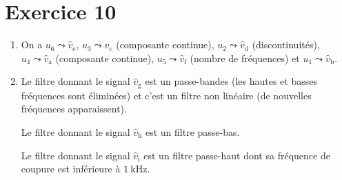 \section{Exercice 10}

\begin{enumerate}
	\item On a $u_6 \leadsto \hat{v}_\mathrm{e}$, $u_3 \leadsto \hat{v}_\mathrm{c}$\/ (composante continue), $u_2 \leadsto \hat{v}_\mathrm{d}$\/ (discontinuités), $u_4 \leadsto \hat{v}_\mathrm{a}$\/ (composante continue), $u_5 \leadsto \hat{v}_\mathrm{f}$\/ (nombre de fréquences) et $u_1 \leadsto \hat{v}_\mathrm{b}$.
	\item
		Le filtre donnant le signal $\hat{v}_\mathrm{g}$\/ est un passe-bandes (les hautes et basses fréquences sont éliminées) et c'est un filtre non linéaire (de nouvelles fréquences apparaissent).

		Le filtre donnant le signal $\hat{v}_\mathrm{h}$\/ est un filtre passe-bas.

		Le filtre donnant le signal $\hat{v}_\mathrm{i}$\/ est un filtre passe-haut dont sa fréquence de coupure est inférieure à $1\:\mathrm{kHz}$.
\end{enumerate}

